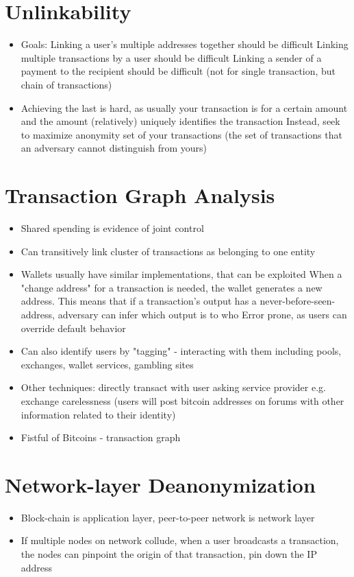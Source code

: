 \documentclass{article}
\begin{document}
\section{Unlinkability}
\begin{itemize}
\item Goals:
\subitem Linking a user's multiple addresses together should be difficult
\subitem Linking multiple transactions by a user should be difficult
\subitem Linking a sender of a payment to the recipient should be difficult (not for single transaction, but chain of transactions)
\item Achieving the last is hard, as usually your transaction is for a certain amount and the amount (relatively) uniquely identifies the transaction
\subitem Instead, seek to maximize anonymity set of your transactions (the set of transactions that an adversary cannot distinguish from yours)
\end{itemize}

\section{Transaction Graph Analysis}
\begin{itemize}
\item Shared spending is evidence of joint control
\item Can transitively link cluster of transactions as belonging to one entity
\item Wallets usually have similar implementations, that can be exploited
\subitem When a "change address" for a transaction is needed, the wallet generates a new address. This means that if a transaction's output has a never-before-seen-address, adversary can infer which output is to who
\subitem Error prone, as users can override default behavior
\item Can also identify users by "tagging" - interacting with them including pools, exchanges, wallet services, gambling sites
\item Other techniques:
\subitem directly transact with user
\subitem asking service provider e.g. exchange
\subitem carelessness (users will post bitcoin addresses on forums with other information related to their identity)
\item Fistful of Bitcoins - transaction graph
\end{itemize}

\section{Network-layer Deanonymization}
\begin{itemize}
\item Block-chain is application layer, peer-to-peer network is network layer
\item If multiple nodes on network collude, when a user broadcasts a transaction, the nodes can pinpoint the origin of that transaction, pin down the IP address
\end{itemize}
\end{document}
